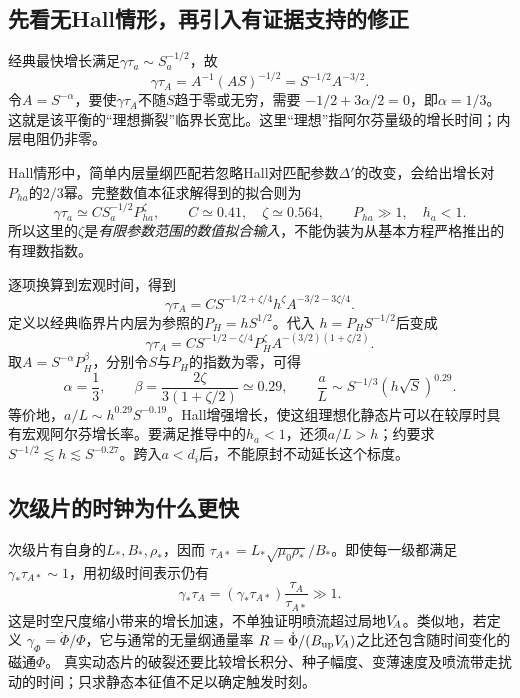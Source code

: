 \documentclass[UTF8,a4paper,11pt,openany,fontset=fandol]{ctexbook}
\begin{document}
\subsection{先看无Hall情形，再引入有证据支持的修正}
经典最快增长满足$\gamma\tau_a\sim S_a^{-1/2}$，故
\begin{equation}
 \gamma\tau_A=A^{-1}(AS)^{-1/2}=S^{-1/2}A^{-3/2}.
\end{equation}
令$A=S^{-\alpha}$，要使$\gamma\tau_A$不随$S$趋于零或无穷，需要
$-1/2+3\alpha/2=0$，即$\alpha=1/3$。这就是该平衡的“理想撕裂”临界长宽比。这里“理想”指阿尔芬量级的增长时间；内层电阻仍非零。

Hall情形中，简单内层量纲匹配若忽略Hall对匹配参数$\Delta'$的改变，会给出增长对$P_{ha}$的$2/3$幂。完整数值本征求解得到的拟合则为
\begin{equation}
 \gamma\tau_a\simeq C S_a^{-1/2}P_{ha}^{\zeta},
 \qquad C\simeq0.41,\quad\zeta\simeq0.564,
 \qquad P_{ha}\gg1,\quad h_a<1.
\end{equation}
所以这里的$\zeta$是\emph{有限参数范围的数值拟合输入}，不能伪装为从基本方程严格推出的有理数指数。

逐项换算到宏观时间，得到
\begin{equation}
 \gamma\tau_A=C S^{-1/2+\zeta/4}h^{\zeta}
 A^{-3/2-3\zeta/4}.
\end{equation}
定义以经典临界片内层为参照的$P_H=hS^{1/2}$。代入
$h=P_HS^{-1/2}$后变成
\begin{equation}
 \gamma\tau_A=C S^{-1/2-\zeta/4}P_H^\zeta
 A^{-(3/2)(1+\zeta/2)}.
\end{equation}
取$A=S^{-\alpha}P_H^\beta$，分别令$S$与$P_H$的指数为零，可得
\begin{equation}
 \alpha=\frac13,\qquad
 \beta=\frac{2\zeta}{3(1+\zeta/2)}\simeq0.29,
 \qquad
 \boxed{\frac{a}{L}\sim S^{-1/3}(h\sqrt S)^{0.29}}.
\end{equation}
等价地，$a/L\sim h^{0.29}S^{-0.19}$。Hall增强增长，使这组理想化静态片可以在较厚时具有宏观阿尔芬增长率。要满足推导中的$h_a<1$，还须$a/L>h$；约要求
$S^{-1/2}\lesssim h\lesssim S^{-0.27}$。跨入$a<d_i$后，不能原封不动延长这个标度。

\subsection{次级片的时钟为什么更快}
次级片有自身的$L_*,B_*,\rho_*$，因而
$\tau_{A*}=L_*\sqrt{\mu_0\rho_*}/B_*$。即使每一级都满足
$\gamma_*\tau_{A*}\sim1$，用初级时间表示仍有
\begin{equation}
 \gamma_*\tau_A=(\gamma_*\tau_{A*})\frac{\tau_A}{\tau_{A*}}\gg1.
\end{equation}
这是时空尺度缩小带来的增长加速，不单独证明喷流超过局地$V_{\!A}$。类似地，若定义
$\gamma_\Phi=\dot\Phi/\Phi$，它与通常的无量纲通量率
$R=\dot\Phi/(B_{\rm up}V_{\!A})$之比还包含随时间变化的磁通$\Phi$。
真实动态片的破裂还要比较增长积分、种子幅度、变薄速度及喷流带走扰动的时间；只求静态本征值不足以确定触发时刻。
\end{document}

